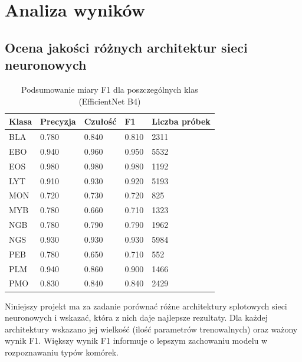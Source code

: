 \chapter{Analiza wyników}


\section{Ocena jakości różnych architektur sieci neuronowych}

\begin{table}
    \caption{Podsumowanie miary F1 dla poszczególnych klas (EfficientNet B4)}
    \begin{center}
        \begin{tabular}{|l|l|l|l|l|}
            \hline
            Klasa & Precyzja & Czułość & F1    & Liczba próbek \\
            \hline
            BLA   & 0.780    & 0.840   & 0.810 & 2311          \\
            \hline
            EBO   & 0.940    & 0.960   & 0.950 & 5532          \\
            \hline
            EOS   & 0.980    & 0.980   & 0.980 & 1192          \\
            \hline
            LYT   & 0.910    & 0.930   & 0.920 & 5193          \\
            \hline
            MON   & 0.720    & 0.730   & 0.720 & 825           \\
            \hline
            MYB   & 0.780    & 0.660   & 0.710 & 1323          \\
            \hline
            NGB   & 0.780    & 0.790   & 0.790 & 1962          \\
            \hline
            NGS   & 0.930    & 0.930   & 0.930 & 5984          \\
            \hline
            PEB   & 0.780    & 0.650   & 0.710 & 552           \\
            \hline
            PLM   & 0.940    & 0.860   & 0.900 & 1466          \\
            \hline
            PMO   & 0.830    & 0.840   & 0.840 & 2429          \\
            \hline
        \end{tabular}
    \end{center}
    \label{tab:f1_summary}
\end{table}

Niniejszy projekt ma za zadanie porównać różne architektury splotowych sieci neuronowych i wskazać, która z nich daje najlepsze rezultaty.
Dla każdej architektury wskazano jej wielkość (ilość parametrów trenowalnych) oraz ważony wynik F1.
Większy wynik F1 informuje o lepszym zachowaniu modelu w rozpoznawaniu typów komórek.

